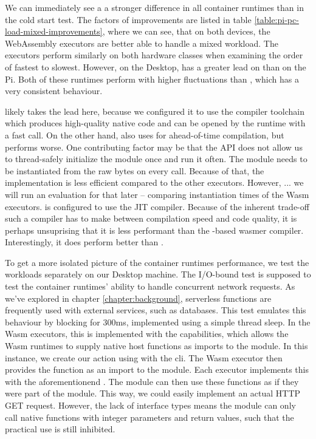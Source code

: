 We can immediately see a a stronger difference in all container runtimes than in the cold start test.
The factors of improvements are listed in table \ref{table:pi-pc-load-mixed-improvements}, where we can see, that on both devices, the WebAssembly executors are better able to handle a mixed workload. The executors perform similarly on both hardware classes when examining the order of fastest to slowest. However, on the Desktop,  has a greater lead on  than on the Pi. Both of these runtimes perform with higher fluctuations than , which has a very consistent behaviour.

 likely takes the lead here, because we configured it to use the  compiler toolchain which produces high-quality native code and can be opened by the runtime with a fast  call. On the other hand,  also uses  for ahead-of-time compilation, but performs worse. One contributing factor may be that the  API does not allow us to thread-safely initialize the module once and run it often. The module needs to be instantiated from the raw bytes on every  call. Because of that, the implementation is less efficient compared to the other executors. However, ... we will run an evaluation for that later -- comparing instantiation times of the Wasm executors.
 is configured to use the  JIT compiler. Because of the inherent trade-off such a compiler has to make between compilation speed and code quality, it is perhaps unsuprising that it is less performant than the -based wasmer compiler. Interestingly, it does perform better than .

To get a more isolated picture of the container runtimes performance, we test the workloads separately on our Desktop machine. The I/O-bound test is supposed to test the container runtimes' ability to handle concurrent network requests. As we've explored in chapter \ref{chapter:background}, serverless functions are frequently used with external services, such as databases. This test emulates this behaviour by blocking for 300ms, implemented using a simple thread sleep. In the Wasm executors, this is implemented with the capabilities, which allows the Wasm runtimes to supply native host functions as imports to the module. In this instance, we create our action using  with the  cli. The Wasm executor then provides the  function as an import to the module. Each executor implements this with the aforementionend . The module can then use these functions as if they were part of the module. This way, we could easily implement an actual HTTP GET request. However, the lack of interface types means the module can only call native functions with integer parameters and return values, such that the practical use is still inhibited.

